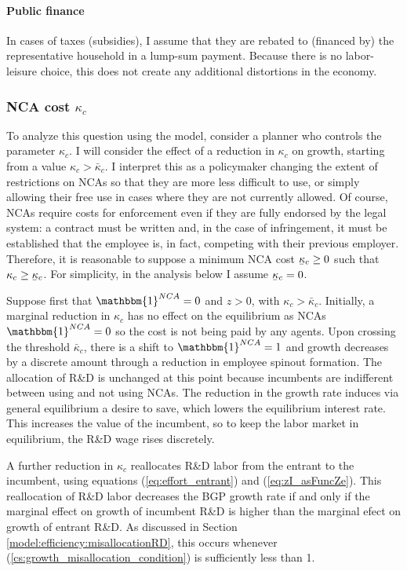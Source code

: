 \documentclass[11pt,english]{article}
\newcommand\munderbar[1]{%
	\underaccent{\bar}{#1}}
\begin{document}
\paragraph{Public finance} 

In cases of taxes (subsidies), I assume that they are rebated to (financed by) the representative household in a lump-sum payment. Because there is no labor-leisure choice, this does not create any additional distortions in the economy.

\subsubsection{NCA cost $\kappa_c$}\label{subsubsec:ncacost}

To analyze this question using the model, consider a planner who controls the parameter $\kappa_c$. I will consider the effect of a reduction in $\kappa_c$ on growth, starting from a value $\kappa_c > \bar{\kappa}_c$. I interpret this as a policymaker changing the extent of restrictions on NCAs so that they are more less difficult to use, or simply allowing their free use in cases where they are not currently allowed. Of course, NCAs require costs for enforcement even if they are fully endorsed by the legal system: a contract must be written and, in the case of infringement, it must be established that the employee is, in fact, competing with their previous employer. Therefore, it is reasonable to suppose a minimum NCA cost $\munderbar{\kappa}_c \ge 0$ such that $\kappa_c \ge \munderbar{\kappa}_c$. For simplicity, in the analysis below I assume $\munderbar{\kappa}_c = 0$.

Suppose first that $\mathbbm{1}^{NCA} = 0$ and $z > 0$, with $\kappa_c > \bar{\kappa}_c$. Initially, a marginal reduction in $\kappa_c$ has no effect on the equilibrium as NCAs $\mathbbm{1}^{NCA} = 0$ so the cost is not being paid by any agents. Upon crossing the threshold $\bar{\kappa}_c$, there is a shift to $\mathbbm{1}^{NCA} = 1$ and growth decreases by a discrete amount through a reduction in employee spinout formation. The allocation of R\&D is unchanged at this point because incumbents are indifferent between using and not using NCAs. The reduction in the growth rate induces via general equilibrium a desire to save, which lowers the equilibrium interest rate. This increases the value of the incumbent, so to keep the labor market in equilibrium, the R\&D wage rises discretely.

A further reduction in $\kappa_c$ reallocates R\&D labor from the entrant to the incumbent, using equations (\ref{eq:effort_entrant}) and (\ref{eq:zI_asFuncZe}). This reallocation of R\&D labor decreases the BGP growth rate if and only if the marginal effect on growth of incumbent R\&D is higher than the marginal efect on growth of entrant R\&D. As discussed in Section \ref{model:efficiency:misallocationRD}, this occurs whenever (\ref{cs:growth_misallocation_condition}) is sufficiently less than 1. 
\end{document}
